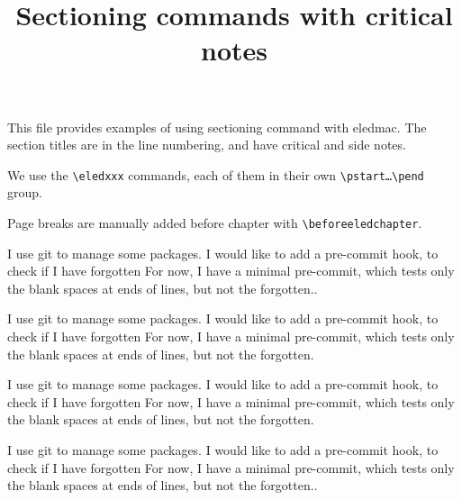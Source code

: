 \documentclass[twoside,12pt]{book}
\begin{document}
\title{Sectioning commands with critical notes}

\date{}

{\let\newpage\relax\maketitle}
{\small
This file provides examples of using sectioning command with eledmac. The section titles are in the line numbering, and have critical and side notes. 

We use the \verb+\eledxxx+ commands, each of them in their own \verb+\pstart…\pend+ group. 

Page breaks are manually added before chapter with \verb+\beforeeledchapter+.
}
\beginnumbering
\beforeeledchapter
\pstart
{}
\pend

\pstart
I use git to manage some packages.
I would like to add a pre-commit hook, to check if I have forgotten
For now, I have a minimal pre-commit, which tests only the blank spaces at ends of lines, but not the forgotten..
\pend

\pstart
{}
\pend

\pstart
{}
\pend

\pstart
{}
\pend

\pstart
I use git to manage some packages.
I would like to add a pre-commit hook, to check if I have forgotten
For now, I have a minimal pre-commit, which tests only the blank spaces at ends of lines, but not the forgotten.
\pend

\pstart
{}
\pend

\pstart
I use git to manage some packages.
I would like to add a pre-commit hook, to check if I have forgotten
For now, I have a minimal pre-commit, which tests only the blank spaces at ends of lines, but not the forgotten.
\pend


\beforeeledchapter
\pstart
{}
\pend

\pstart
I use git to manage some packages.
I would like to add a pre-commit hook, to check if I have forgotten
For now, I have a minimal pre-commit, which tests only the blank spaces at ends of lines, but not the forgotten..
\pend
\end{document}
